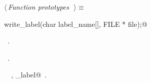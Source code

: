 \documentclass{report}
\begin{document}
\begin{flushleft} \small
\begin{minipage}{\linewidth} \label{scrap242}
$\langle\,${\it Function prototypes}\nobreak\ {\footnotesize {}}$\,\rangle\equiv$
\vspace{-1ex}
\begin{list}{}{} \item
\mbox{}\verb@void write_label(char label_name[], FILE * file);@\\
\mbox{}\verb@@{\NWsep}
\end{list}
\vspace{-1ex}
\footnotesize\addtolength{\baselineskip}{-1ex}
\begin{list}{}{\setlength{\itemsep}{-\parsep}\setlength{\itemindent}{-\leftmargin}}
\item \NWtxtMacroDefBy\ .
\item \NWtxtMacroRefIn\ .
\end{list}
\vspace{-2ex}
\footnotesize\addtolength{\baselineskip}{-1ex}
\begin{list}{}{\setlength{\itemsep}{-\parsep}\setlength{\itemindent}{-\leftmargin}}
\item \NWtxtIdentsUsed\nobreak\  \verb@FILE@\nobreak\ , \verb@write_label@\nobreak\ .\end{list}
\end{minipage}\\[4ex]
\end{flushleft}
\end{document}
